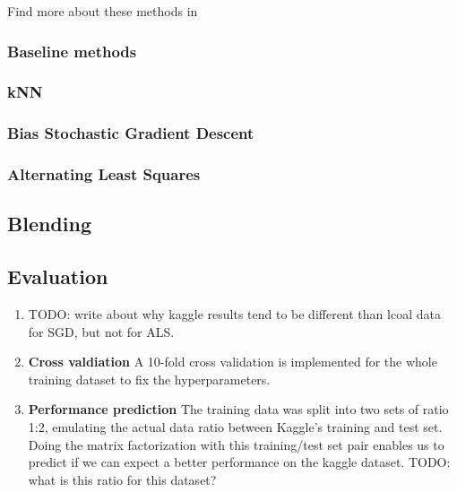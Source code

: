 Find more about these methods in \cite{Aberger2009}



\subsubsection{Baseline methods}


\subsubsection{kNN}


\subsubsection{Bias Stochastic Gradient Descent}



\subsubsection{Alternating Least Squares}





\subsection{Blending}



\subsection{Evaluation}

\begin{enumerate}
  \item TODO: write about why kaggle results tend to be different than lcoal data for
    SGD, but not for ALS.
  \item \textbf{Cross valdiation} A 10-fold cross validation is implemented
    for the whole training dataset to fix the hyperparameters. 

  \item \textbf{Performance prediction} The training data was split into two
    sets of ratio 1:2, emulating the actual data ratio between Kaggle's training
    and test set. Doing the matrix factorization with this training/test set
    pair enables us to predict if we can expect a better performance on the
    kaggle dataset.  
    TODO: what is this ratio for this dataset? 
\end{enumerate}

